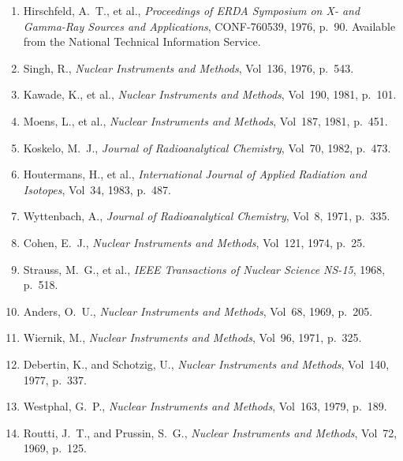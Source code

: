 \documentclass[12pt]{article}
\begin{document}
\begin{enumerate}[label=(\arabic*),leftmargin=3em]
  \item Hirschfeld, A.~T., et al., \textit{Proceedings of ERDA Symposium on X- and
        Gamma-Ray Sources and Applications}, CONF-760539, 1976, p.~90. Available from
        the National Technical Information Service.

  \item Singh, R., \textit{Nuclear Instruments and Methods}, Vol~136, 1976, p.~543.

  \item Kawade, K., et al., \textit{Nuclear Instruments and Methods}, Vol~190, 1981,
        p.~101.

  \item Moens, L., et al., \textit{Nuclear Instruments and Methods}, Vol~187, 1981,
        p.~451.

  \item Koskelo, M.~J., \textit{Journal of Radioanalytical Chemistry}, Vol~70, 1982,
        p.~473.

  \item Houtermans, H., et al., \textit{International Journal of Applied Radiation and
        Isotopes}, Vol~34, 1983, p.~487.

  \item Wyttenbach, A., \textit{Journal of Radioanalytical Chemistry}, Vol~8, 1971,
        p.~335.

  \item Cohen, E.~J., \textit{Nuclear Instruments and Methods}, Vol~121, 1974, p.~25.

  \item Strauss, M.~G., et al., \textit{IEEE Transactions of Nuclear Science NS-15},
        1968, p.~518.

  \item Anders, O.~U., \textit{Nuclear Instruments and Methods}, Vol~68, 1969, p.~205.

  \item Wiernik, M., \textit{Nuclear Instruments and Methods}, Vol~96, 1971, p.~325.

  \item Debertin, K., and Schotzig, U., \textit{Nuclear Instruments and Methods},
        Vol~140, 1977, p.~337.

  \item Westphal, G.~P., \textit{Nuclear Instruments and Methods}, Vol~163, 1979,
        p.~189.

  \item Routti, J.~T., and Prussin, S.~G., \textit{Nuclear Instruments and Methods},
        Vol~72, 1969, p.~125.


\end{enumerate}
\end{document}
